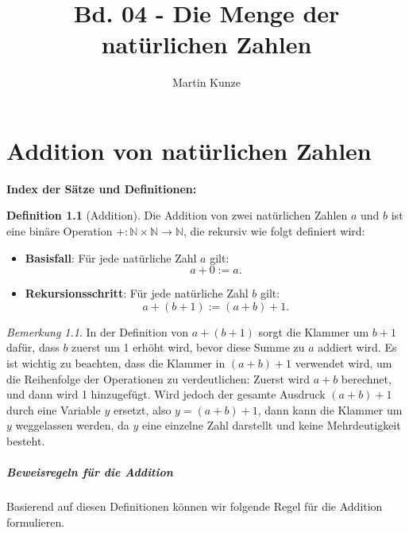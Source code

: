 \documentclass{book}
\title{Bd. 04 - Die Menge der natürlichen Zahlen}
\author{Martin Kunze}
\date{}
\theoremstyle{plain}
\theoremstyle{remark}
\newtheorem*{remark}{Bemerkung}
\theoremstyle{definition}
\newtheorem{definition}{Definition}[section]
\begin{document}
\maketitle
\tableofcontents
\listoftheorems

\chapter{Addition von natürlichen Zahlen}

\textbf{Index der Sätze und Definitionen:}


\begin{definition}[Addition]
    Die Addition von zwei natürlichen Zahlen \( a \) und \( b \) ist eine binäre Operation \( +: \mathbb{N} \times \mathbb{N} \to \mathbb{N} \), die rekursiv wie folgt definiert wird:
    
    \begin{itemize}
        \item \textbf{Basisfall}: Für jede natürliche Zahl \( a \) gilt:
        \[
        a + 0 := a.
        \]
        
        \item \textbf{Rekursionsschritt}: Für jede natürliche Zahl \( b \) gilt:
        \[
        a + (b+1) := (a + b) + 1.
        \]
    \end{itemize}
\end{definition}

\begin{remark}
In der Definition von \( a + (b+1) \) sorgt die Klammer um \( b+1 \) dafür, dass \( b \) zuerst um 1 erhöht wird, bevor diese Summe zu \( a \) addiert wird. Es ist wichtig zu beachten, dass die Klammer in \( (a + b) + 1 \) verwendet wird, um die Reihenfolge der Operationen zu verdeutlichen: Zuerst wird \( a + b \) berechnet, und dann wird 1 hinzugefügt. Wird jedoch der gesamte Ausdruck \( (a + b) + 1 \) durch eine Variable \( y \) ersetzt, also \( y = (a + b) + 1 \), dann kann die Klammer um \( y \) weggelassen werden, da \( y \) eine einzelne Zahl darstellt und keine Mehrdeutigkeit besteht.
\end{remark}



\paragraph{Beweisregeln für die Addition}
\label{rule:rAddI} 
Basierend auf diesen Definitionen können wir folgende Regel für die Addition formulieren. 
\end{document}
